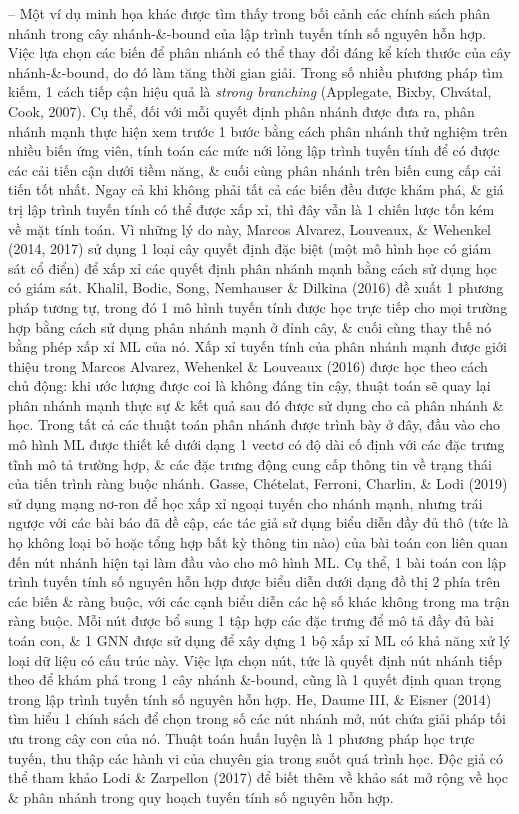 \documentclass{article}
\begin{document}
\begin{itemize}
\begin{itemize}
\begin{itemize}
            -- Một ví dụ minh họa khác được tìm thấy trong bối cảnh các chính sách phân nhánh trong cây nhánh-\&-bound của lập trình tuyến tính số nguyên hỗn hợp. Việc lựa chọn các biến để phân nhánh có thể thay đổi đáng kể kích thước của cây nhánh-\&-bound, do đó làm tăng thời gian giải. Trong số nhiều phương pháp tìm kiếm, 1 cách tiếp cận hiệu quả là {\it strong branching} (Applegate, Bixby, Chvátal, Cook, 2007). Cụ thể, đối với mỗi quyết định phân nhánh được đưa ra, phân nhánh mạnh thực hiện xem trước 1 bước bằng cách phân nhánh thử nghiệm trên nhiều biến ứng viên, tính toán các mức nới lỏng lập trình tuyến tính để có được các cải tiến cận dưới tiềm năng, \& cuối cùng phân nhánh trên biến cung cấp cải tiến tốt nhất. Ngay cả khi không phải tất cả các biến đều được khám phá, \& giá trị lập trình tuyến tính có thể được xấp xỉ, thì đây vẫn là 1 chiến lược tốn kém về mặt tính toán. Vì những lý do này, Marcos Alvarez, Louveaux, \& Wehenkel (2014, 2017) sử dụng 1 loại cây quyết định đặc biệt (một mô hình học có giám sát cổ điển) để xấp xỉ các quyết định phân nhánh mạnh bằng cách sử dụng học có giám sát. Khalil, Bodic, Song, Nemhauser \& Dilkina (2016) đề xuất 1 phương pháp tương tự, trong đó 1 mô hình tuyến tính được học trực tiếp cho mọi trường hợp bằng cách sử dụng phân nhánh mạnh ở đỉnh cây, \& cuối cùng thay thế nó bằng phép xấp xỉ ML của nó. Xấp xỉ tuyến tính của phân nhánh mạnh được giới thiệu trong Marcos Alvarez, Wehenkel \& Louveaux (2016) được học theo cách chủ động: khi ước lượng được coi là không đáng tin cậy, thuật toán sẽ quay lại phân nhánh mạnh thực sự \& kết quả sau đó được sử dụng cho cả phân nhánh \& học. Trong tất cả các thuật toán phân nhánh được trình bày ở đây, đầu vào cho mô hình ML được thiết kế dưới dạng 1 vectơ có độ dài cố định với các đặc trưng tĩnh mô tả trường hợp, \& các đặc trưng động cung cấp thông tin về trạng thái của tiến trình ràng buộc nhánh. Gasse, Chételat, Ferroni, Charlin, \& Lodi (2019) sử dụng mạng nơ-ron để học xấp xỉ ngoại tuyến cho nhánh mạnh, nhưng trái ngược với các bài báo đã đề cập, các tác giả sử dụng biểu diễn đầy đủ thô (tức là họ không loại bỏ hoặc tổng hợp bất kỳ thông tin nào) của bài toán con liên quan đến nút nhánh hiện tại làm đầu vào cho mô hình ML. Cụ thể, 1 bài toán con lập trình tuyến tính số nguyên hỗn hợp được biểu diễn dưới dạng đồ thị 2 phía trên các biến \& ràng buộc, với các cạnh biểu diễn các hệ số khác không trong ma trận ràng buộc. Mỗi nút được bổ sung 1 tập hợp các đặc trưng để mô tả đầy đủ bài toán con, \& 1 GNN được sử dụng để xây dựng 1 bộ xấp xỉ ML có khả năng xử lý loại dữ liệu có cấu trúc này. Việc lựa chọn nút, tức là quyết định nút nhánh tiếp theo để khám phá trong 1 cây nhánh \&-bound, cũng là 1 quyết định quan trọng trong lập trình tuyến tính số nguyên hỗn hợp. He, Daume III, \& Eisner (2014) tìm hiểu 1 chính sách để chọn trong số các nút nhánh mở, nút chứa giải pháp tối ưu trong cây con của nó. Thuật toán huấn luyện là 1 phương pháp học trực tuyến, thu thập các hành vi của chuyên gia trong suốt quá trình học. Độc giả có thể tham khảo Lodi \& Zarpellon (2017) để biết thêm về khảo sát mở rộng về học \& phân nhánh trong quy hoạch tuyến tính số nguyên hỗn hợp.


\end{itemize}
\end{itemize}
\end{itemize}
\end{document}
